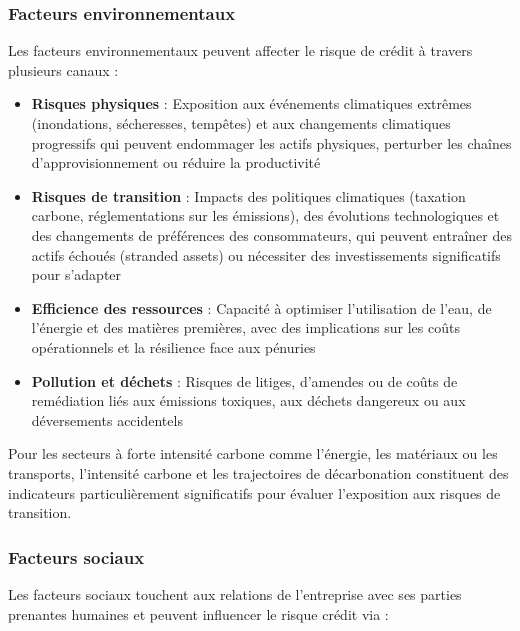 \subsubsection{Facteurs environnementaux}

Les facteurs environnementaux peuvent affecter le risque de crédit à travers plusieurs canaux :

\begin{itemize}
    \item \textbf{Risques physiques} : Exposition aux événements climatiques extrêmes (inondations, sécheresses, tempêtes) et aux changements climatiques progressifs qui peuvent endommager les actifs physiques, perturber les chaînes d'approvisionnement ou réduire la productivité
    
    \item \textbf{Risques de transition} : Impacts des politiques climatiques (taxation carbone, réglementations sur les émissions), des évolutions technologiques et des changements de préférences des consommateurs, qui peuvent entraîner des actifs échoués (stranded assets) ou nécessiter des investissements significatifs pour s'adapter
    
    \item \textbf{Efficience des ressources} : Capacité à optimiser l'utilisation de l'eau, de l'énergie et des matières premières, avec des implications sur les coûts opérationnels et la résilience face aux pénuries
    
    \item \textbf{Pollution et déchets} : Risques de litiges, d'amendes ou de coûts de remédiation liés aux émissions toxiques, aux déchets dangereux ou aux déversements accidentels
\end{itemize}

Pour les secteurs à forte intensité carbone comme l'énergie, les matériaux ou les transports, l'intensité carbone et les trajectoires de décarbonation constituent des indicateurs particulièrement significatifs pour évaluer l'exposition aux risques de transition.

\subsubsection{Facteurs sociaux}

Les facteurs sociaux touchent aux relations de l'entreprise avec ses parties prenantes humaines et peuvent influencer le risque crédit via :

